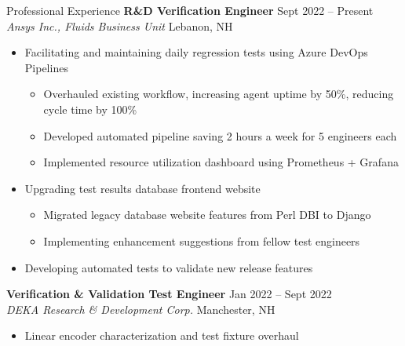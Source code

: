 \documentclass{resume}
\begin{document}
\begin{rSection}{Professional Experience}
    {\bf R\&D Verification Engineer} \hfill {Sept 2022 -- Present}
    \\{\em Ansys Inc., Fluids Business Unit} \hfill {Lebanon, NH}
    \vspace{-0.5em}
    \begin{itemize}[label={\tiny\raisebox{1ex}{\textbullet}}, noitemsep]
        \item Facilitating and maintaining daily regression tests using Azure DevOps Pipelines
        \begin{itemize}[label={\tiny\raisebox{1ex}{\textbullet}}, noitemsep]
            \item Overhauled existing workflow, increasing agent uptime by 50\%, reducing cycle time by 100\%
            \item Developed automated pipeline saving 2 hours a week for 5 engineers each 
            \item Implemented resource utilization dashboard using Prometheus + Grafana
        \end{itemize}
        \item Upgrading test results database frontend website
        \begin{itemize}[label={\tiny\raisebox{1ex}{\textbullet}}, noitemsep]
            \item Migrated legacy database website features from Perl DBI to Django 
            \item Implementing enhancement suggestions from fellow test engineers
        \end{itemize}
        \item Developing automated tests to validate new release features
    \end{itemize}
    \vspace{-0.4em}
    {\bf Verification \& Validation Test Engineer} \hfill {Jan 2022 -- Sept 2022}
    \\{\em DEKA Research \& Development Corp.} \hfill {Manchester, NH}
    \vspace{-0.5em}
    \begin{itemize}[label={\tiny\raisebox{1ex}{\textbullet}}, noitemsep]
        \item Linear encoder characterization and test fixture overhaul

\end{itemize}
\end{rSection}
\end{document}
